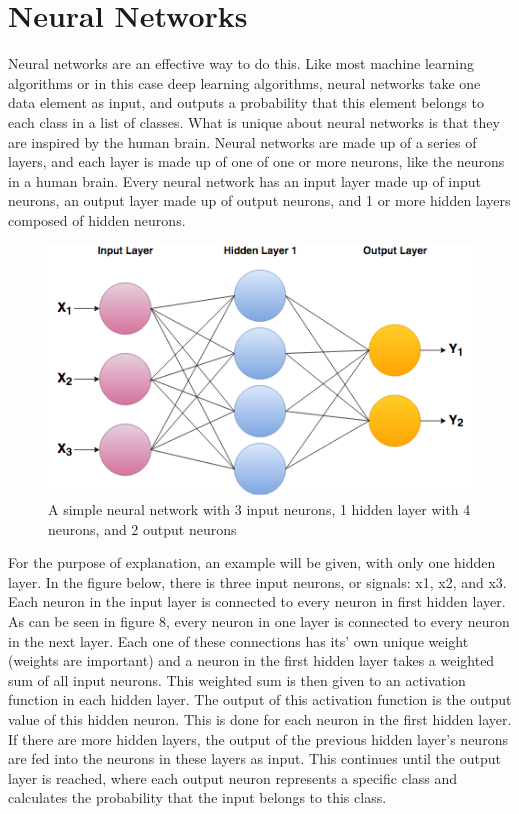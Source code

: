 \documentclass[12pt]{report} %
\begin{document}
\section{Neural Networks}
	Neural networks are an effective way to do this. Like most machine learning algorithms or in this case deep learning algorithms, neural networks take one data element as input, and outputs a probability that this element belongs to each class in a list of classes. What is unique about neural networks is that they are inspired by the human brain. Neural networks are made up of a series of layers, and each layer is made up of one of one or more neurons, like the neurons in a human brain. Every neural network has an input layer made up of input neurons, an output layer made up of output neurons, and 1 or more hidden layers composed of hidden neurons.

\begin{figure}
\centering
\includegraphics[width=5in]{NeuralNetwork}
\caption{A simple neural network with 3 input neurons, 1 hidden layer with 4 neurons, and 2 output neurons}
\end{figure}
	For the purpose of explanation, an example will be given, with only one hidden layer. In the figure below, there is three input neurons, or signals: x1, x2, and x3. Each neuron in the input layer is connected to every neuron in first hidden layer. As can be seen in figure 8, every neuron in one layer is connected to every neuron in the next layer. Each one of these connections has its' own unique weight (weights are important) and a neuron in the first hidden layer takes a weighted sum of all input neurons. This weighted sum is then given to an activation function in each hidden layer. The output of this activation function is the output value of this hidden neuron. This is done for each neuron in the first hidden layer. If there are more hidden layers, the output of the previous hidden layer's neurons are fed into the neurons in these layers as input. This continues until the output layer is reached, where each output neuron represents a specific class and calculates the probability that the input belongs to this class.\cite{KubatMachineLearn}
	
\end{document}
